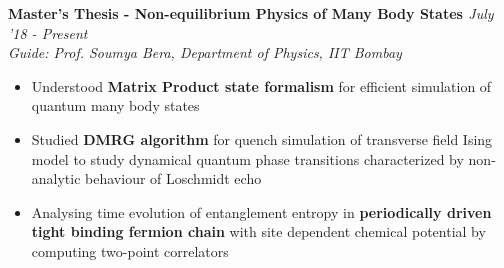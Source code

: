 \documentclass[10pt]{article}%
\newcommand{\xfilll}[2][1ex]{
\dimen0=#2\advance\dimen0 by #1
\leaders\hrule height \dimen0 depth -#1\hfill}
\begin{document}
{\begin{itemize}
\end{itemize}

 \vspace{-4mm}

{\flushleft \bf \large{Master's Thesis - Non-equilibrium Physics of Many Body States }}  \hfill {{{\textit{July '18 - Present}}}} \\
{\em Guide: Prof. Soumya Bera, Department of Physics, IIT Bombay} 

\begin{itemize}
    \setlength\itemsep{0.01em}
    \item Understood \textbf{Matrix Product state formalism} for efficient simulation of quantum many body states
    \item Studied \textbf{DMRG algorithm} for quench simulation of transverse field Ising model to study dynamical quantum phase transitions characterized by non-analytic behaviour of Loschmidt echo
    \item Analysing time evolution of entanglement entropy in \textbf{periodically driven tight binding fermion chain} with site dependent chemical potential by computing two-point correlators
\end{itemize}

}
\end{document}
